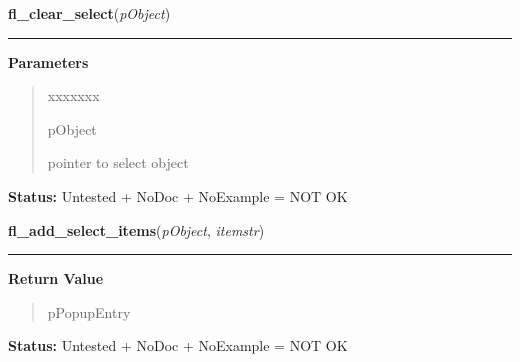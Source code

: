     \label{xformslib:library:fl_clear_select}

    \vspace{0.5ex}

\hspace{.8\funcindent}\begin{boxedminipage}{\funcwidth}

    \raggedright \textbf{fl\_clear\_select}(\textit{pObject})

    \vspace{-1.5ex}

    \rule{\textwidth}{0.5\fboxrule}
\setlength{\parskip}{2ex}
\setlength{\parskip}{1ex}
      \textbf{Parameters}
      \vspace{-1ex}

      \begin{quote}
        \begin{Ventry}{xxxxxxx}

          \item[pObject]

          pointer to select object

        \end{Ventry}

      \end{quote}

\textbf{Status:} Untested + NoDoc + NoExample = NOT OK



    \end{boxedminipage}

    \label{xformslib:library:fl_add_select_items}

    \vspace{0.5ex}

\hspace{.8\funcindent}\begin{boxedminipage}{\funcwidth}

    \raggedright \textbf{fl\_add\_select\_items}(\textit{pObject}, \textit{itemstr})

    \vspace{-1.5ex}

    \rule{\textwidth}{0.5\fboxrule}
\setlength{\parskip}{2ex}
\setlength{\parskip}{1ex}
      \textbf{Return Value}
    \vspace{-1ex}

      \begin{quote}
      pPopupEntry

      \end{quote}

\textbf{Status:} Untested + NoDoc + NoExample = NOT OK



    \end{boxedminipage}

